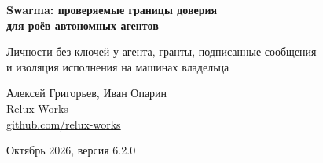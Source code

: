 \documentclass[10pt,a4paper]{article}
\begin{document}
\begin{center}
{\fontsize{16}{19.5}\selectfont\bfseries Swarma: проверяемые границы доверия\\[2pt] для роёв автономных агентов\par}
\vspace{5pt}
{\normalsize Личности без ключей у агента, гранты, подписанные сообщения\\ и изоляция исполнения на машинах владельца\par}
\vspace{8pt}
{\normalsize Алексей Григорьев, Иван Опарин\\
Relux Works\\
\href{https://github.com/relux-works}{github.com/relux-works}\par}
\vspace{3pt}
{\normalsize Октябрь 2026, версия 6.2.0\par}
\end{center}

\vspace{4pt}
\end{document}

